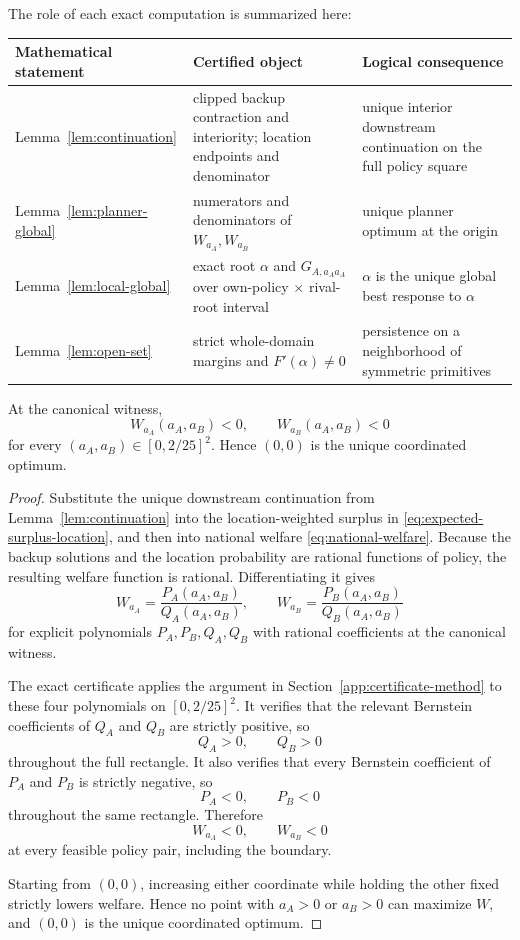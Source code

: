 The role of each exact computation is summarized here:
\begin{center}
\begin{tabular}{>{\raggedright\arraybackslash}p{}>{\raggedright\arraybackslash}p{}>{\raggedright\arraybackslash}p{}}
\toprule
Mathematical statement & Certified object & Logical consequence \\
\midrule
Lemma~\ref{lem:continuation} & clipped backup contraction and interiority; location endpoints and denominator & unique interior downstream continuation on the full policy square \\
Lemma~\ref{lem:planner-global} & numerators and denominators of $W_{a_A},W_{a_B}$ & unique planner optimum at the origin \\
Lemma~\ref{lem:local-global} & exact root $\alpha$ and $G_{A,a_Aa_A}$ over own-policy $\times$ rival-root interval & $\alpha$ is the unique global best response to $\alpha$ \\
Lemma~\ref{lem:open-set} & strict whole-domain margins and $F'(\alpha)\neq0$ & persistence on a neighborhood of symmetric primitives \\
\bottomrule
\end{tabular}
\end{center}

\begin{lemma}\label{lem:planner-global}
At the canonical witness,
\begin{equation}
W_{a_A}(a_A,a_B)<0,
\qquad
W_{a_B}(a_A,a_B)<0
\end{equation}
for every $(a_A,a_B)\in[0,2/25]^2$. Hence $(0,0)$ is the unique coordinated optimum.
\end{lemma}

\begin{proof}
Substitute the unique downstream continuation from Lemma~\ref{lem:continuation} into the location-weighted surplus in \eqref{eq:expected-surplus-location}, and then into national welfare \eqref{eq:national-welfare}. Because the backup solutions and the location probability are rational functions of policy, the resulting welfare function is rational. Differentiating it gives
\[
W_{a_A}=\frac{P_A(a_A,a_B)}{Q_A(a_A,a_B)},
\qquad
W_{a_B}=\frac{P_B(a_A,a_B)}{Q_B(a_A,a_B)}
\]
for explicit polynomials $P_A,P_B,Q_A,Q_B$ with rational coefficients at the canonical witness.

The exact certificate applies the argument in Section~\ref{app:certificate-method} to these four polynomials on $[0,2/25]^2$. It verifies that the relevant Bernstein coefficients of $Q_A$ and $Q_B$ are strictly positive, so
\[
Q_A>0,\qquad Q_B>0
\]
throughout the full rectangle. It also verifies that every Bernstein coefficient of $P_A$ and $P_B$ is strictly negative, so
\[
P_A<0,\qquad P_B<0
\]
throughout the same rectangle. Therefore
\[
W_{a_A}<0,\qquad W_{a_B}<0
\]
at every feasible policy pair, including the boundary.

Starting from $(0,0)$, increasing either coordinate while holding the other fixed strictly lowers welfare. Hence no point with $a_A>0$ or $a_B>0$ can maximize $W$, and $(0,0)$ is the unique coordinated optimum.
\end{proof}


